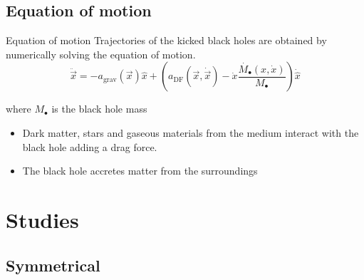 \documentclass{beamer}
\begin{document}
\subsection{Equation of motion}
	\begin{frame}{Equation of motion}
	Trajectories of the kicked black holes are obtained by numerically solving the equation of motion.
	\begin{equation}\label{eq: equationMotion}
		\ddot{\vec{x}} = -a_\text{grav}(\vec{x})\hat{x} + \left(a_\text{DF}(\vec{x}, \dot{\vec{x}})-\dot{x}\dfrac{\dot{M_\bullet}(x, \dot{x})}{M_\bullet}\right)\dot{\hat{x}} 
	\end{equation}
	
	where $M_\bullet$ is the black hole mass
	
	\begin{itemize}
		\item Dark matter, stars and gaseous materials from the medium interact with the black hole adding a drag force.
		\item The black hole accretes matter from the surroundings
	\end{itemize}
\end{frame}

\section{Studies}
\subsection{Symmetrical}
\end{document}
